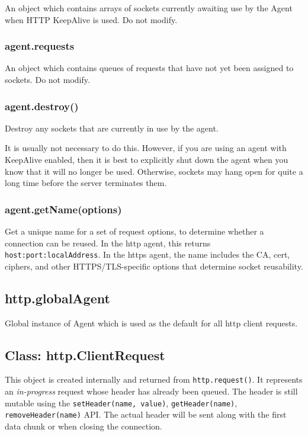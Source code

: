 An object which contains arrays of sockets currently awaiting use by the
Agent when HTTP KeepAlive is used. Do not modify.

\subsubsection{agent.requests}\label{agent.requests}

An object which contains queues of requests that have not yet been
assigned to sockets. Do not modify.

\subsubsection{agent.destroy()}\label{agent.destroy}

Destroy any sockets that are currently in use by the agent.

It is usually not necessary to do this. However, if you are using an
agent with KeepAlive enabled, then it is best to explicitly shut down
the agent when you know that it will no longer be used. Otherwise,
sockets may hang open for quite a long time before the server terminates
them.

\subsubsection{agent.getName(options)}\label{agent.getnameoptions}

Get a unique name for a set of request options, to determine whether a
connection can be reused. In the http agent, this returns
\texttt{host:port:localAddress}. In the https agent, the name includes
the CA, cert, ciphers, and other HTTPS/TLS-specific options that
determine socket reusability.

\subsection{http.globalAgent}\label{http.globalagent}

Global instance of Agent which is used as the default for all http
client requests.

\subsection{Class: http.ClientRequest}\label{class-http.clientrequest}

This object is created internally and returned from
\texttt{http.request()}. It represents an \emph{in-progress} request
whose header has already been queued. The header is still mutable using
the \texttt{setHeader(name,\ value)}, \texttt{getHeader(name)},
\texttt{removeHeader(name)} API. The actual header will be sent along
with the first data chunk or when closing the connection.

